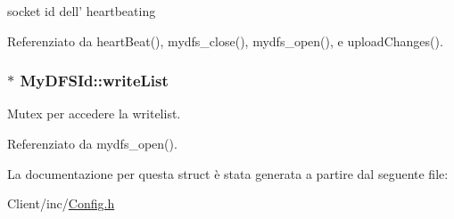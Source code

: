 socket id dell' heartbeating 



Referenziato da heart\+Beat(), mydfs\+\_\+close(), mydfs\+\_\+open(), e upload\+Changes().

\hypertarget{structMyDFSId_a0f7d2a9c60ddc649ee7e65b8b9295432}{
\subsubsection[{write\+List}]{$\ast$ My\+D\+F\+S\+Id\+::write\+List}}\label{structMyDFSId_a0f7d2a9c60ddc649ee7e65b8b9295432}


Mutex per accedere la writelist. 



Referenziato da mydfs\+\_\+open().



La documentazione per questa struct è stata generata a partire dal seguente file\+:\begin{DoxyCompactItemize}
\item 
Client/inc/\hyperlink{Client_2inc_2Config_8h}{Config.\+h}\end{DoxyCompactItemize}
